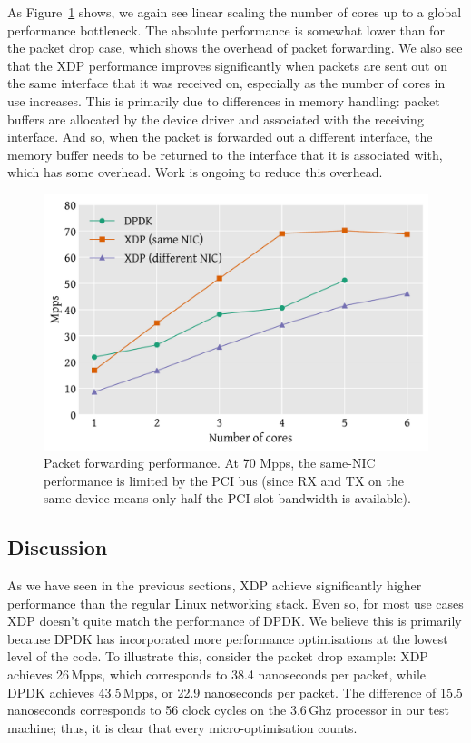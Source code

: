 \documentclass[10pt,sigconf]{acmart}
\begin{document}
As Figure~\ref{fig:redirect-test} shows, we again see linear scaling the number
of cores up to a global performance bottleneck. The absolute performance is
somewhat lower than for the packet drop case, which shows the overhead of packet
forwarding. We also see that the XDP performance improves significantly when
packets are sent out on the same interface that it was received on, especially
as the number of cores in use increases. This is primarily due to differences in
memory handling: packet buffers are allocated by the device driver and
associated with the receiving interface. And so, when the packet is forwarded
out a different interface, the memory buffer needs to be returned to the
interface that it is associated with, which has some overhead. Work is ongoing
to reduce this overhead.

\begin{figure}[t]
\centering
\includegraphics[width=\linewidth]{figures/redirect-test.pdf}
\caption{\label{fig:redirect-test} Packet forwarding performance. At 70 Mpps,
  the same-NIC performance is limited by the PCI bus (since RX and TX on the
  same device means only half the PCI slot bandwidth is available).}
\end{figure}

\subsection{Discussion}
\label{sec:perf-discussion}

As we have seen in the previous sections, XDP achieve significantly higher
performance than the regular Linux networking stack. Even so, for most use cases
XDP doesn't quite match the performance of DPDK. We believe this is primarily
because DPDK has incorporated more performance optimisations at the lowest level
of the code. To illustrate this, consider the packet drop example: XDP achieves
26\,Mpps, which corresponds to 38.4 nanoseconds per packet, while DPDK achieves
43.5\,Mpps, or 22.9 nanoseconds per packet. The difference of 15.5 nanoseconds
corresponds to 56 clock cycles on the 3.6\,Ghz processor in our test machine;
thus, it is clear that every micro-optimisation counts.
\end{document}
